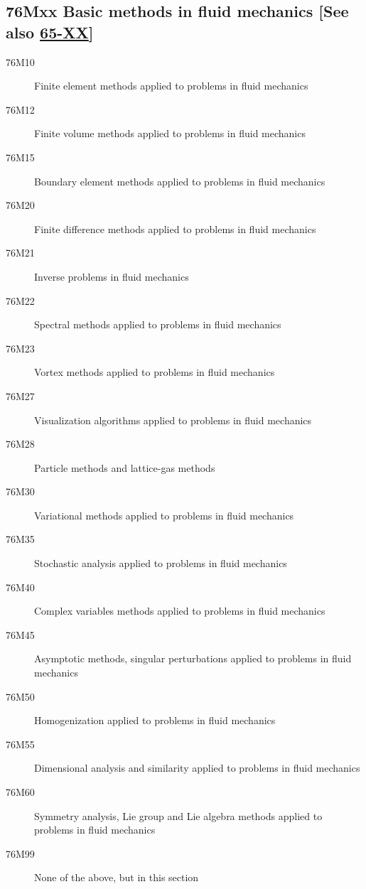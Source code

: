 \documentclass[letterpaper]{article}
\begin{document}
\subsection*{76Mxx  Basic methods in fluid mechanics [See also \hyperref[65-XX]{65-XX}] }\label{76Mxx}
\begin{description}  
\item [76M10]\label{76M10} Finite element methods applied to problems in fluid mechanics
\item [76M12]\label{76M12} Finite volume methods applied to problems in fluid mechanics
\item [76M15]\label{76M15} Boundary element methods applied to problems in fluid mechanics
\item [76M20]\label{76M20} Finite difference methods applied to problems in fluid mechanics
\item [76M21]\label{76M21} Inverse problems in fluid mechanics
\item [76M22]\label{76M22} Spectral methods applied to problems in fluid mechanics 
\item [76M23]\label{76M23} Vortex methods applied to problems in fluid mechanics
\item [76M27]\label{76M27} Visualization algorithms applied to problems in fluid mechanics
\item [76M28]\label{76M28} Particle methods and lattice-gas methods
\item [76M30]\label{76M30} Variational methods applied to problems in fluid mechanics
\item [76M35]\label{76M35} Stochastic analysis applied to problems in fluid mechanics
\item [76M40]\label{76M40} Complex variables methods applied to problems in fluid mechanics
\item [76M45]\label{76M45} Asymptotic methods, singular perturbations applied to problems in fluid mechanics
\item [76M50]\label{76M50} Homogenization applied to problems in fluid mechanics
\item [76M55]\label{76M55} Dimensional analysis and similarity applied to problems in fluid mechanics
\item [76M60]\label{76M60} Symmetry analysis, Lie group and Lie algebra methods applied to problems in fluid mechanics
\item [76M99]\label{76M99} None of the above, but in this section
\end{description}
\end{document}
